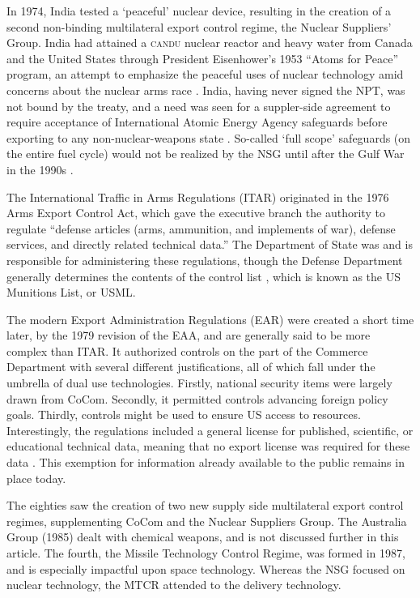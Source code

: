 \documentclass[12pt]{olfmemo}
\begin{document}
In 1974, India tested a `peaceful' nuclear device, resulting in the creation of a second non-binding multilateral export control regime, the Nuclear Suppliers' Group. India had attained a \textsc{candu} nuclear reactor and heavy water from Canada and the United States through President Eisenhower's 1953 ``Atoms for Peace'' program, an attempt to emphasize the peaceful uses of nuclear technology amid concerns about the nuclear arms race \citep{Walker2001}. India, having never signed the NPT, was not bound by the treaty, and a need was seen for a suppler-side agreement to require acceptance of International Atomic Energy Agency safeguards before exporting to any non-nuclear-weapons state \citep{Burr2014}. So-called `full scope' safeguards (on the entire fuel cycle) would not be realized by the NSG until after the Gulf War in the 1990s \citep{Anthony2007}.

The International Traffic in Arms Regulations (ITAR) originated in the 1976 Arms Export Control Act, which gave the executive branch the authority to regulate ``defense articles (arms, ammunition, and implements of war), defense services, and directly related technical data.'' The Department of State was and is responsible for administering these regulations, though the Defense Department generally determines the contents of the control list \citep{NAP1987}, which is known as the US Munitions List, or USML.

The modern Export Administration Regulations (EAR) were created a short time later, by the 1979 revision of the EAA, and are generally said to be more complex than ITAR. It authorized controls on the part of the Commerce Department with several different justifications, all of which fall under the umbrella of dual use technologies. Firstly, national security items were largely drawn from CoCom. Secondly, it permitted controls advancing foreign policy goals. Thirdly, controls might be used to ensure US access to resources. Interestingly, the regulations included a general license for published, scientific, or educational technical data, meaning that no export license was required for these data \citep{NAP1987}. This exemption for information already available to the public remains in place today.

The eighties saw the creation of two new supply side multilateral export control regimes, supplementing CoCom and the Nuclear Suppliers Group. The Australia Group (1985) dealt with chemical weapons, and is not discussed further in this article. The fourth, the Missile Technology Control Regime, was formed in 1987, and is especially impactful upon space technology. Whereas the NSG focused on nuclear technology, the MTCR attended to the delivery technology.
\end{document}

